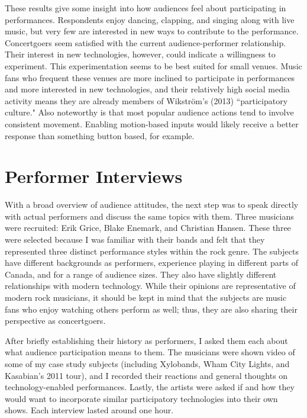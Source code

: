 These results give some insight into how audiences feel about participating in performances. Respondents enjoy dancing, clapping, and singing along with live music, but very few are interested in new ways to contribute to the performance. Concertgoers seem satisfied with the current audience-performer relationship. Their interest in new technologies, however, could indicate a willingness to experiment. This experimentation seems to be best suited for small venues. Music fans who frequent these venues are more inclined to participate in performances and more interested in new technologies, and their relatively high social media activity means they are already members of Wikstr\"{o}m's (2013) ``participatory culture." Also noteworthy is that most popular audience actions tend to involve consistent movement. Enabling motion-based inputs would likely receive a better response than something button based, for example.



\section{Performer Interviews}

With a broad overview of audience attitudes, the next step was to speak directly with actual performers and discuss the same topics with them. Three musicians were recruited: Erik Grice, Blake Enemark, and Christian Hansen. These three were selected because I was familiar with their bands and felt that they represented three distinct performance styles within the rock genre. The subjects have different backgrounds as performers, experience playing in different parts of Canada, and for a range of audience sizes. They also have slightly different relationships with modern technology. While their opinions are representative of modern rock musicians, it should be kept in mind that the subjects are music fans who enjoy watching others perform as well; thus, they are also sharing their perspective as concertgoers.

After briefly establishing their history as performers, I asked them each about what audience participation means to them. The musicians were shown video of some of my case study subjects (including Xylobands, Wham City Lights, and Kasabian's 2011 tour), and I recorded their reactions and general thoughts on technology-enabled performances. Lastly, the artists were asked if and how they would want to incorporate similar participatory technologies into their own shows. Each interview lasted around one hour.

